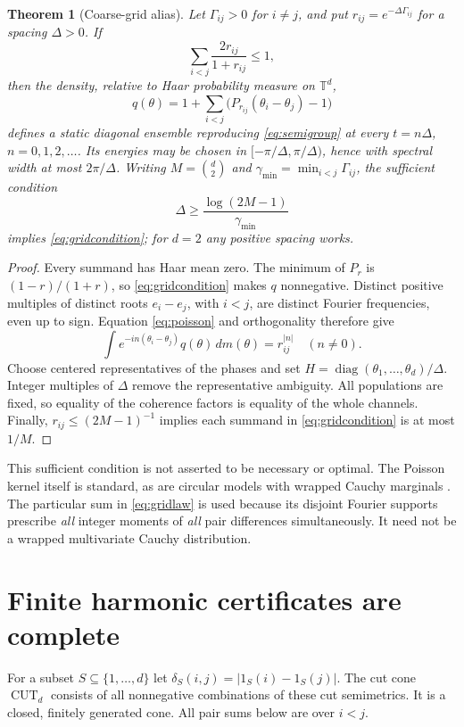 \documentclass[11pt,a4paper]{article}
\newtheorem{theorem}{Theorem}[section]
\theoremstyle{remark}\newtheorem{remark}[theorem]{Remark}
\newcommand{\T}{\mathbb T}\newcommand{\E}{\mathbb E}
\newcommand{\CUT}{\operatorname{CUT}}
\newcommand{\diag}{\operatorname{diag}}
\begin{document}
\begin{theorem}[Coarse-grid alias]\label{thm:grid}
Let $\Gamma_{ij}>0$ for $i\ne j$, and put
$r_{ij}=e^{-\Delta\Gamma_{ij}}$ for a spacing $\Delta>0$. If
\begin{equation}\label{eq:gridcondition}
 \sum_{i<j}\frac{2r_{ij}}{1+r_{ij}}\leq1,
\end{equation}
then the density, relative to Haar probability measure on $\T^d$,
\begin{equation}\label{eq:gridlaw}
 q(\theta)=1+\sum_{i<j}\bigl(P_{r_{ij}}(\theta_i-\theta_j)-1\bigr)
\end{equation}
defines a static diagonal ensemble reproducing \eqref{eq:semigroup}
at every $t=n\Delta$, $n=0,1,2,\ldots$. Its energies may be chosen in
$[-\pi/\Delta,\pi/\Delta)$, hence with spectral width at most
$2\pi/\Delta$. Writing $M=\binom d2$ and
$\gamma_{\min}=\min_{i<j}\Gamma_{ij}$, the sufficient condition
\begin{equation}\label{eq:coarsebound}
 \Delta\geq\frac{\log(2M-1)}{\gamma_{\min}}
\end{equation}
implies \eqref{eq:gridcondition}; for $d=2$ any positive spacing works.
\end{theorem}
\begin{proof}
Every summand has Haar mean zero. The minimum of $P_r$ is
$(1-r)/(1+r)$, so \eqref{eq:gridcondition} makes $q$ nonnegative.
Distinct positive multiples of distinct roots $e_i-e_j$, with $i<j$,
are distinct Fourier frequencies, even up to sign. Equation
\eqref{eq:poisson} and orthogonality therefore give
\[
 \int e^{-in(\theta_i-\theta_j)}q(\theta)\,dm(\theta)
   =r_{ij}^{|n|}\quad(n\ne0).
\]
Choose centered representatives of the phases and set
$H=\diag(\theta_1,\ldots,\theta_d)/\Delta$. Integer multiples of
$\Delta$ remove the representative ambiguity. All populations are fixed,
so equality of the coherence factors is equality of the whole channels.
Finally, $r_{ij}\leq(2M-1)^{-1}$ implies each summand in
\eqref{eq:gridcondition} is at most $1/M$.
\end{proof}

This sufficient condition is not asserted to be necessary or optimal.
The Poisson kernel itself is standard, as are circular models with
wrapped Cauchy marginals \cite{kato}. The particular sum in
\eqref{eq:gridlaw} is used because its disjoint Fourier supports prescribe
\emph{all} integer moments of \emph{all} pair differences simultaneously.
It need not be a wrapped multivariate Cauchy distribution.

\section{Finite harmonic certificates are complete}\label{sec:finite}
For a subset $S\subseteq\{1,\ldots,d\}$ let
$\delta_S(i,j)=|1_S(i)-1_S(j)|$. The cut cone $\CUT_d$ consists of all
nonnegative combinations of these cut semimetrics. It is a closed,
finitely generated cone. All pair sums below are over $i<j$.
\end{document}

